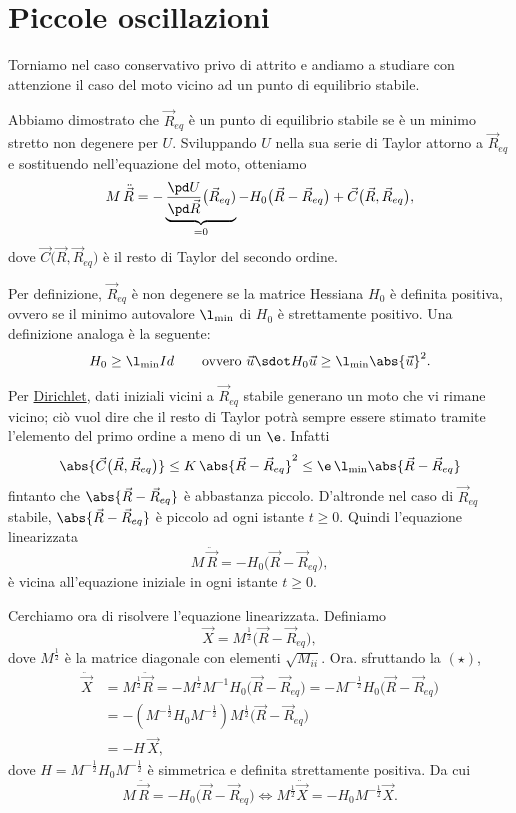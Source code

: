 \section{Piccole oscillazioni}

Torniamo nel caso conservativo privo di attrito e andiamo a studiare con attenzione il caso del moto vicino ad un punto di equilibrio stabile.

Abbiamo dimostrato che \(\vec{R}_{eq}\) è un punto di equilibrio stabile se è un minimo stretto non degenere per \(U\).
Sviluppando \(U\) nella sua serie di Taylor attorno a \(\vec{R}_{eq}\) e sostituendo nell'equazione del moto, otteniamo
\[
	M\,\ddot{\vec{R}} = -\underbrace{\frac{\pd U}{\pd \vec{R}}\big(\vec{R}_{eq})}_{= 0} - H_0 \big(\vec{R}-\vec{R}_{eq}\big) + \vec{C}\big(\vec{R},\vec{R}_{eq}\big),
\]
dove \(\vec{C}\big(\vec{R},\vec{R}_{eq}\big)\) è il resto di Taylor del secondo ordine.

\begin{oss}
	Per definizione, \(\vec{R}_{eq}\) è non degenere se la matrice Hessiana \(H_0\) è definita positiva, ovvero se il minimo autovalore \(\l_{\min}\) di \(H_0\) è strettamente positivo.
	Una definizione analoga è la seguente:
	\[
		H_0 \ge \l_{\min}Id \qquad\text{ovvero } \vec{u}\sdot H_0\vec{u} \ge \l_{\min}\abs{\vec{u}}^2.
	\]
\end{oss}

Per \hyperref[th:teoremaDirichlet]{Dirichlet}, dati iniziali vicini a \(\vec{R}_{eq}\) stabile generano un moto che vi rimane vicino; ciò vuol dire che il resto di Taylor potrà sempre essere stimato tramite l'elemento del primo ordine a meno di un \(\e\). Infatti
\[
	\abs{\vec{C}\big(\vec{R},\vec{R}_{eq}\big)} \le K\,\abs{\vec{R}-\vec{R}_{eq}}^2 \le \e\,\l_{\min}\abs{\vec{R}-\vec{R}_{eq}}
\]
fintanto che \(\abs{\vec{R}-\vec{R}_{eq}}\) è abbastanza piccolo.
D'altronde nel caso di \(\vec{R}_{eq}\) stabile, \(\abs{\vec{R}-\vec{R}_{eq}}\) è piccolo ad ogni istante \(t\ge 0\).
Quindi l'equazione linearizzata
\[
	M\,\ddot{\vec{R}} = -H_0\big(\vec{R}-\vec{R}_{eq}\big),\tag{\(\star\)}
\]
è vicina all'equazione iniziale in ogni istante \(t\ge 0\).

Cerchiamo ora di risolvere l'equazione linearizzata.
Definiamo
\[
	\vec{X} = M^{\frac{1}{2}}\big(\vec{R}-\vec{R}_{eq}\big),
\]
dove \(M^{\frac{1}{2}}\) è la matrice diagonale con elementi \(\sqrt{M_{ii}}\).
Ora. sfruttando la \((\star)\),
\[
	\begin{split}
		\ddot{\vec{X}} & = M^{\frac{1}{2}}\ddot{\vec{R}} = -M^{\frac{1}{2}}M^{-1}H_0\big(\vec{R}-\vec{R}_{eq}\big) = -M^{-\frac{1}{2}}H_0\big(\vec{R}-\vec{R}_{eq}\big)\\
		& = -(M^{-\frac{1}{2}}H_0 M^{-\frac{1}{2}}) M^{\frac{1}{2}}\big(\vec{R}-\vec{R}_{eq}\big)\\
		& = -H\,\vec{X},
	\end{split}
\]
dove \(H=M^{-\frac{1}{2}}H_0 M^{-\frac{1}{2}}\) è simmetrica e definita strettamente positiva. Da cui
\[
	M\,\ddot{\vec{R}} = -H_0 \big(\vec{R}-\vec{R}_{eq}\big) \iff M^{\frac{1}{2}}\ddot{\vec{X}} = -H_0 M^{-\frac{1}{2}} \vec{X}.
\]

